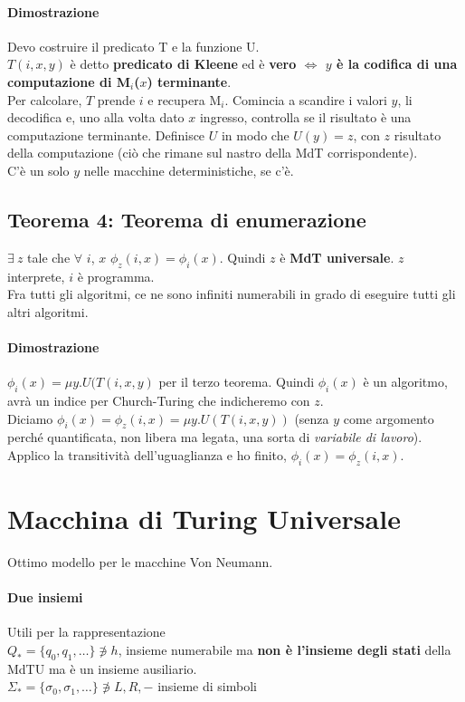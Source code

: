 \documentclass[10pt]{book}
\begin{document}
\paragraph{Dimostrazione} Devo costruire il predicato T e la funzione U.\\
$T(i, x, y)$ è detto \textbf{predicato di Kleene} ed è \textbf{vero $\Leftrightarrow$ $y$ è la codifica di una computazione di M$_i$($x$) terminante}.\\
Per calcolare, $T$ prende $i$ e recupera M$_i$. Comincia a scandire i valori $y$, li decodifica e, uno alla volta dato $x$ ingresso, controlla se il risultato è una computazione terminante. Definisce $U$ in modo che $U(y) = z$, con $z$ risultato della computazione (ciò che rimane sul nastro della MdT corrispondente).\\
C'è un solo $y$ nelle macchine deterministiche, se c'è.
\subsection{Teorema 4: Teorema di enumerazione}
$\exists\: z$ tale che $\forall$ $i$, $x$ $\phi_z(i, x) = \phi_i(x)$. Quindi $z$ è \textbf{MdT universale}. $z$ interprete, $i$ è programma.\\
Fra tutti gli algoritmi, ce ne sono infiniti numerabili in grado di eseguire tutti gli altri algoritmi.\\
\paragraph{Dimostrazione} $\phi_i(x) = \mu y.U(T(i, x, y)$ per il terzo teorema. Quindi $\phi_i(x)$ è un algoritmo, avrà un indice per Church-Turing che indicheremo con $z$.\\
Diciamo $\phi_i(x) = \phi_z(i, x) = \mu y.U(T(i, x, y))$ (senza $y$ come argomento perché quantificata, non libera ma legata, una sorta di \textit{variabile di lavoro}). Applico la transitività dell'uguaglianza e ho finito, $\phi_i(x) = \phi_z(i, x)$.
\pagebreak
\section{Macchina di Turing Universale}
Ottimo modello per le macchine Von Neumann.
\paragraph{Due insiemi} Utili per la rappresentazione\\
$Q_* = \{q_0, q_1, \ldots\} \not\ni h$, insieme numerabile ma \textbf{non è l'insieme degli stati} della MdTU ma è un insieme ausiliario.\\
$\Sigma_* = \{\sigma_0, \sigma_1, \ldots\} \not\ni L, R, -$ insieme di simboli
\end{document}
